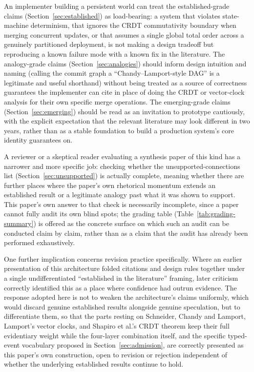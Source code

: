 \documentclass[11pt]{article}
\begin{document}
An implementer building a persistent world can treat the established-grade claims (Section~\ref{sec:established}) as load-bearing: a system that violates state-machine determinism, that ignores the CRDT commutativity boundary when merging concurrent updates, or that assumes a single global total order across a genuinely partitioned deployment, is not making a design tradeoff but reproducing a known failure mode with a known fix in the literature. The analogy-grade claims (Section~\ref{sec:analogies}) should inform design intuition and naming (calling the commit graph a ``Chandy--Lamport-style DAG'' is a legitimate and useful shorthand) without being treated as a source of correctness guarantees the implementer can cite in place of doing the CRDT or vector-clock analysis for their own specific merge operations. The emerging-grade claims (Section~\ref{sec:emerging}) should be read as an invitation to prototype cautiously, with the explicit expectation that the relevant literature may look different in two years, rather than as a stable foundation to build a production system's core identity guarantees on.

A reviewer or a skeptical reader evaluating a synthesis paper of this kind has a narrower and more specific job: checking whether the unsupported-connections list (Section~\ref{sec:unsupported}) is actually complete, meaning whether there are further places where the paper's own rhetorical momentum extends an established result or a legitimate analogy past what it was shown to support. This paper's own answer to that check is necessarily incomplete, since a paper cannot fully audit its own blind spots; the grading table (Table~\ref{tab:grading-summary}) is offered as the concrete surface on which such an audit can be conducted claim by claim, rather than as a claim that the audit has already been performed exhaustively.

One further implication concerns revision practice specifically. Where an earlier presentation of this architecture folded citations and design rules together under a single undifferentiated ``established in the literature'' framing, later criticism correctly identified this as a place where confidence had outrun evidence. The response adopted here is not to weaken the architecture's claims uniformly, which would discard genuine established results alongside genuine speculation, but to differentiate them, so that the parts resting on Schneider, Chandy and Lamport, Lamport's vector clocks, and Shapiro et al.'s CRDT theorem keep their full evidentiary weight while the four-layer combination itself, and the specific typed-event vocabulary proposed in Section~\ref{sec:admission}, are correctly presented as this paper's own construction, open to revision or rejection independent of whether the underlying established results continue to hold.
\end{document}
